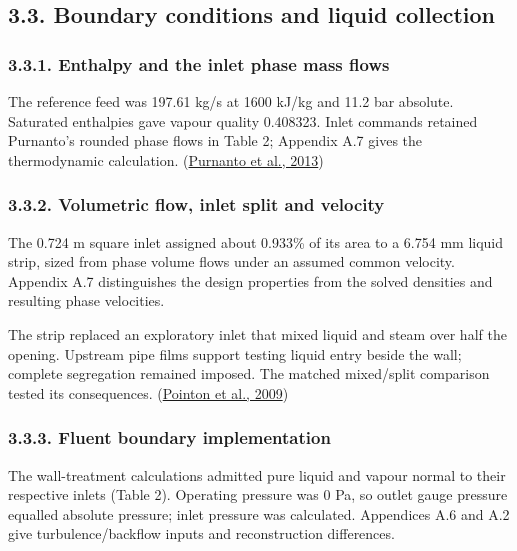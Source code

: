 \documentclass[
  12pt,
  a4paper,
]{article}
\begin{document}
\subsection{3.3. Boundary conditions and liquid
collection}\label{boundary-conditions-and-liquid-collection}

\subsubsection{3.3.1. Enthalpy and the inlet phase mass
flows}\label{enthalpy-and-the-inlet-phase-mass-flows}

The reference feed was 197.61 kg/s at 1600 kJ/kg and 11.2 bar absolute.
Saturated enthalpies gave vapour quality 0.408323. Inlet commands
retained Purnanto's rounded phase flows in Table 2; Appendix A.7 gives
the thermodynamic calculation.
(\href{https://www.researchgate.net/publication/269519626_CFD_MODELLING_OF_TWO-PHASE_FLOW_INSIDE_GEOTHERMAL_STEAM-WATER_SEPARATORS}{Purnanto
et al., 2013})

\subsubsection{3.3.2. Volumetric flow, inlet split and
velocity}\label{volumetric-flow-inlet-split-and-velocity}

The 0.724 m square inlet assigned about 0.933\% of its area to a 6.754
mm liquid strip, sized from phase volume flows under an assumed common
velocity. Appendix A.7 distinguishes the design properties from the
solved densities and resulting phase velocities.

The strip replaced an exploratory inlet that mixed liquid and steam over
half the opening. Upstream pipe films support testing liquid entry
beside the wall; complete segregation remained imposed. The matched
mixed/split comparison tested its consequences.
(\href{https://publications.mygeoenergynow.org/grc/1028587.pdf}{Pointon
et al., 2009})

\subsubsection{3.3.3. Fluent boundary
implementation}\label{fluent-boundary-implementation}

The wall-treatment calculations admitted pure liquid and vapour normal
to their respective inlets (Table 2). Operating pressure was 0 Pa, so
outlet gauge pressure equalled absolute pressure; inlet pressure was
calculated. Appendices A.6 and A.2 give turbulence/backflow inputs and
reconstruction differences.
\end{document}
